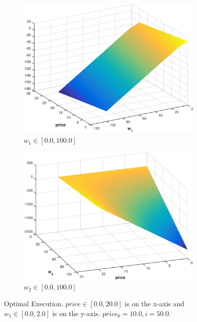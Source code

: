 \begin{figure}[t!]
    \centering
    \begin{subfigure}[b]{0.4\textwidth}    
        \includegraphics[width=\linewidth, height=0.8\linewidth]{images/opt_execution_w1}
        \caption{$ w_1 \in \left[ 0.0, 100.0 \right]$}
        \label{fig:opt_execution_w1}
        \vspace{1em}
    \end{subfigure}
    
    \begin{subfigure}[b]{0.4\textwidth}    
        \includegraphics[width=\linewidth, height=0.8\linewidth]{images/opt_execution_w2}
        \caption{$ w_2 \in \left[ 0.0, 100.0 \right]$}
        \label{fig:pt_execution_w2}
    \end{subfigure}  
    \caption{Optimal Execution. $ price \in \left[ 0.0, 20.0 \right]$ is on the x-axis and $ w_1 \in \left[ 0.0, 2.0 \right]$ is on the y-axis. $ price_0 = 10.0, i = 50.0$.}
    \label{fig:pt_execution}
\end{figure}
